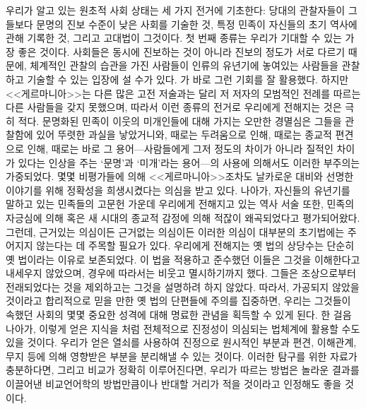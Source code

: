 우리가 알고 있는 원초적 사회 상태는 세 가지 전거에 기초한다:
\label{contemporary}%
당대의
관찰자들이 그들보다 문명의 진보 수준이 낮은 사회를 기술한 것,
특정 민족이 자신들의 초기 역사에 관해 기록한 것,
그리고 고대법이 그것이다.
첫 번째 종류는 우리가 기대할 수 있는 가장 좋은 것이다.
사회들은 동시에 진보하는 것이 아니라 진보의 정도가 서로 다르기 때문에,
체계적인 관찰의 습관을 가진 사람들이 인류의 유년기에 놓여있는 사람들을
관찰하고 기술할 수 있는 입장에 설 수가 있다.
가 바로 그런 기회를 잘 활용했다.
하지만 <<게르마니아>>는 다른 많은 고전 저술과는 달리
저 저자의 모범적인 전례를 따르는 다른 사람들을 갖지 못했으며,
따라서 이런 종류의 전거로 우리에게 전해지는 것은 극히 적다.
문명화된 민족이 이웃의 미개인들에 대해 가지는 오만한 경멸심은
그들을 관찰함에 있어 뚜렷한 과실을 낳았거니와,
때로는 두려움으로 인해, 때로는 종교적 편견으로 인해,
때로는 바로 그 용어---사람들에게 그저 정도의 차이가 아니라 질적인 차이가
있다는 인상을 주는 `문명'과 `미개'라는
용어---의 사용에 의해서도
이러한 부주의는 가중되었다.
몇몇 비평가들에 의해
<<게르마니아>>조차도
날카로운 대비와 선명한 이야기를 위해 정확성을 희생시켰다는 의심을 받고 있다.
나아가, 자신들의 유년기를 말하고 있는 민족들의 고문헌 가운데
우리에게 전해지고 있는 역사 서술 또한,
민족의 자긍심에 의해 혹은 새 시대의 종교적 감정에 의해
적잖이 왜곡되었다고 평가되어왔다.
그런데, 근거있는 의심이든 근거없는 의심이든 이러한 의심이
대부분의 초기법에는 주어지지 않는다는 데 주목할 필요가 있다.
우리에게 전해지는 옛 법의 상당수는
단순히 옛 법이라는 이유로 보존되었다.
이 법을 적용하고 준수했던 이들은 그것을 이해한다고 내세우지 않았으며,
경우에 따라서는 비웃고 멸시하기까지 했다.
그들은 조상으로부터 전래되었다는 것을 제외하고는 그것을 설명하려 하지 않았다.
따라서, 가공되지 않았을 것이라고 합리적으로 믿을 만한 옛 법의 단편들에
주의를 집중하면, 우리는 그것들이 속했던 사회의 몇몇 중요한 성격에 대해
명료한 관념을 획득할 수 있게 된다.
한 걸음 나아가, 이렇게 얻은 지식을 처럼
전체적으로
진정성이
의심되는 법체계에 활용할 수도 있을 것이다.
우리가 얻은 열쇠를 사용하여 진정으로 원시적인 부분과
편견, 이해관계, 무지 등에 의해 영향받은 부분을 분리해낼 수 있는 것이다.
이러한 탐구를 위한 자료가 충분하다면,
그리고 비교가 정확히 이루어진다면,
우리가 따르는 방법은 놀라운 결과를 이끌어낸 비교언어학의 방법만큼이나
반대할 거리가 적을 것이라고 인정해도 좋을 것이다.

